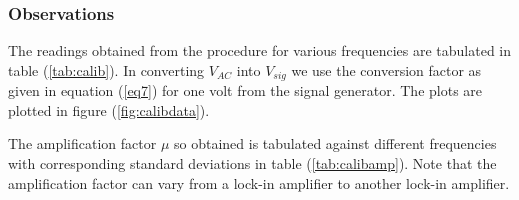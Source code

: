\documentclass[%
 reprint,
nofootinbib,
 amsmath,amssymb,
 aps,
]{revtex4-2}
\begin{document}
    \subsubsection{Observations}
    The readings obtained from the procedure for various frequencies are tabulated in table (\ref{tab:calib}). In converting $V_{AC}$ into $V_{sig}$ we use the conversion factor as given in equation (\ref{eq7}) for one volt from the signal generator. The plots are plotted in figure (\ref{fig:calibdata}).
    \par
    The amplification factor $\mu$ so obtained is tabulated against different frequencies with corresponding standard deviations in table (\ref{tab:calibamp}). Note that the amplification factor can vary from a lock-in amplifier to another lock-in amplifier.
    \begin{table}[]
    \caption{\label{tab:calib} Readings for the calibration of the lock-in amplifier}
    \centering
\end{table}
\end{document}
